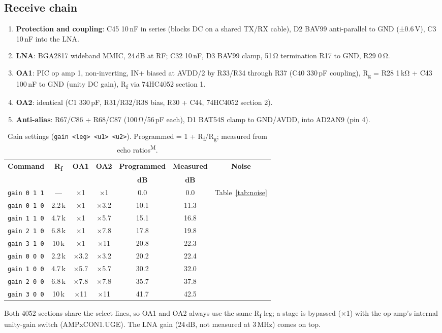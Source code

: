 \documentclass[10pt,a4paper]{article}
\newcommand{\cmd}[1]{\texttt{#1}}
\newcommand{\meas}{\textsuperscript{M}}
\begin{document}
\subsection{Receive chain}
\begin{enumerate}
  \item \textbf{Protection and coupling}: C45 10\,nF in series (blocks DC on a shared TX/RX cable), D2 BAV99 anti-parallel to GND (±0.6\,V), C3 10\,nF into the LNA.
  \item \textbf{LNA}: BGA2817 wideband MMIC, 24\,dB at RF; C32 10\,nF, D3 BAV99 clamp, 51\,Ω termination R17 to GND, R29 0\,Ω.
  \item \textbf{OA1}: PIC op amp 1, non-inverting, IN+ biased at AVDD/2 by R33/R34 through R37 (C40 330\,pF coupling), R\textsubscript{g} = R28 1\,kΩ + C43 100\,nF to GND (unity DC gain), R\textsubscript{f} via 74HC4052 section 1.
  \item \textbf{OA2}: identical (C1 330\,pF, R31/R32/R38 bias, R30 + C44, 74HC4052 section 2).
  \item \textbf{Anti-alias}: R67/C86 + R68/C87 (100\,Ω/56\,pF each), D1 BAT54S clamp to GND/AVDD, into AD2AN9 (pin 4).
\end{enumerate}

\begin{table}[H]\centering\small
\caption{Gain settings (\cmd{gain <leg> <u1> <u2>}). Programmed = 1 + R\textsubscript{f}/R\textsubscript{g}; measured from echo ratios\meas.}
\begin{tabular}{@{}lcccccc@{}}\toprule
\textbf{Command} & \textbf{R\textsubscript{f}} & \textbf{OA1} & \textbf{OA2} & \textbf{Programmed} & \textbf{Measured} & \textbf{Noise}\\
& & & & \textbf{dB} & \textbf{dB} & \\\midrule
\cmd{gain 0 1 1} & — & ×1 & ×1 & 0.0 & 0.0 & Table~\ref{tab:noise}\\
\cmd{gain 0 1 0} & 2.2\,k & ×1 & ×3.2 & 10.1 & 11.3 & \\
\cmd{gain 1 1 0} & 4.7\,k & ×1 & ×5.7 & 15.1 & 16.8 & \\
\cmd{gain 2 1 0} & 6.8\,k & ×1 & ×7.8 & 17.8 & 19.8 & \\
\cmd{gain 3 1 0} & 10\,k & ×1 & ×11 & 20.8 & 22.3 & \\
\cmd{gain 0 0 0} & 2.2\,k & ×3.2 & ×3.2 & 20.2 & 22.4 & \\
\cmd{gain 1 0 0} & 4.7\,k & ×5.7 & ×5.7 & 30.2 & 32.0 & \\
\cmd{gain 2 0 0} & 6.8\,k & ×7.8 & ×7.8 & 35.7 & 37.8 & \\
\cmd{gain 3 0 0} & 10\,k & ×11 & ×11 & 41.7 & 42.5 & \\\bottomrule
\end{tabular}\end{table}
Both 4052 sections share the select lines, so OA1 and OA2 always use the same R\textsubscript{f} leg; a stage is bypassed (×1) with the
op-amp's internal unity-gain switch (AMPxCON1.UGE). The LNA gain (24\,dB, not measured at 3\,MHz) comes on top.
\end{document}
